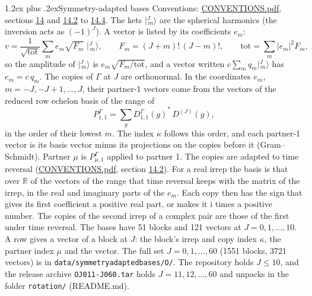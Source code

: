 \documentclass[10pt,a4paper]{article}
\makeatletter
\renewcommand\section{\@startsection{section}{1}{\z@}{-3ex plus -1ex minus -.2ex}%
  {1.2ex plus .2ex}{\normalfont\large\sffamily\bfseries\color{parttitle}}}
\numberwithin{equation}{section}
\newcommand{\iunit}{\mathrm{i}}
\newcommand{\irrJ}[1]{D^{(#1)}}
\newcommand{\repD}[1]{D^{#1}}
\newcommand{\conj}[1]{{#1}^{*}}
\newcommand{\mult}{\kappa}
\newcommand{\intx}{\mu}
\newcommand{\jm}[2]{\bigl\lvert{}^{#1}_{\,#2}\bigr\rangle}
\makeatother
\begin{document}
\section{Symmetry-adapted bases}\label{s:bases}
Conventions: \href{../../CONVENTIONS.pdf}{CONVENTIONS.pdf}, sections \href{../../CONVENTIONS.pdf\#conv.14}{14} and \href{../../CONVENTIONS.pdf\#conv.14.2}{14.2} to \href{../../CONVENTIONS.pdf\#conv.14.4}{14.4}.
\leavevmode\label{n:index.m}\label{n:vector.ket}The kets $\jm{J}{m}$ are the spherical harmonics (the inversion acts as $(-1)^J$). \label{n:index.ketcoefficient}\label{n:vector.basis.symmetry}\label{n:index.ketweight}\label{n:index.total}A vector is listed by its coefficients $e_m$:
\begin{equation}\label{e:ket}v = \frac{1}{\sqrt{\mathrm{tot}}}\sum_m e_m\sqrt{F_m}\;\jm{J}{m},\qquad F_m = (J+m)!\,(J-m)!,\qquad \mathrm{tot} = \sum_m |e_m|^2F_m,\end{equation}
\leavevmode\label{n:index.factor.c}\label{n:index.multiplicity.copies}so the amplitude of $\jm{J}{m}$ is $e_m\sqrt{F_m/\mathrm{tot}}$, and a vector written $c\sum_m q_m\jm{J}{m}$ has $e_m = c\,q_m$.
The copies of $\Gamma$ at $J$ are orthonormal. \label{n:matrix.projector}In the coordinates $e_m$, $m = -J, -J+1, \dots, J$, their partner-1 vectors come from the vectors of the reduced row echelon basis of the range of
\begin{equation}\label{e:projector}P^\Gamma_{1,1} = \sum_g \conj{\repD{\Gamma}_{1,1}(g)}\,\irrJ{J}(g),\end{equation}
in the order of their lowest $m$. The index $\mult$ follows this order, and each partner-1 vector is its basis vector minus its projections on the copies before it (Gram--Schmidt). Partner $\intx$ is $P^\Gamma_{\intx,1}$ applied to partner 1. The copies are adapted to time reversal (\href{../../CONVENTIONS.pdf}{CONVENTIONS.pdf}, section \href{../../CONVENTIONS.pdf\#conv.14.2}{14.2}). For a real irrep the basis is that over $\mathbb{R}$ of the vectors of the range that time reversal keeps with the matrix of the irrep, in the real and imaginary parts of the $e_m$. Each copy then has the sign that gives its first coefficient a positive real part, or makes it $\iunit$ times a positive number. The copies of the second irrep of a complex pair are those of the first under time reversal.
The bases have 51 blocks and 121 vectors at $J = 0, 1, \dots, 10$. \label{n:head.vector}A row gives a vector of a block at $J$: the block's irrep and copy index $\mult$, the partner index $\intx$ and the vector. The full set $J = 0, 1, \dots, 60$ (1551 blocks, 3721 vectors) is in \texttt{data/symmetryadaptedbases/O/}. The repository holds $J \le 10$, and the release archive \texttt{OJ011-J060.tar} holds $J = 11, 12, \dots, 60$ and unpacks in the folder \texttt{rotation/} (README.md).
\end{document}
